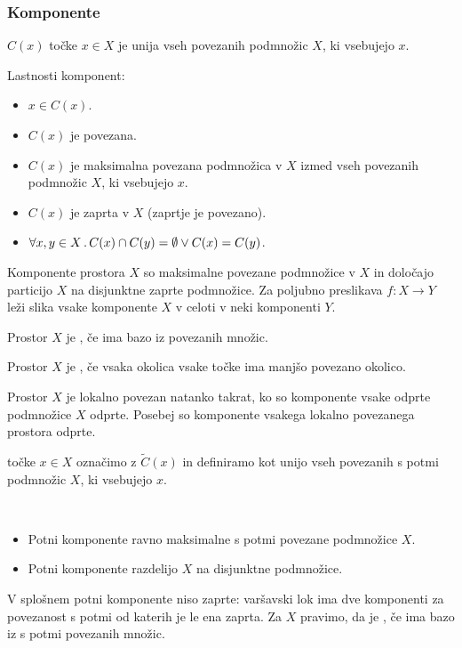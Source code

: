 \subsubsection{Komponente}
\begin{definicija}
     $C(x)$ točke $x \in X$ je unija vseh povezanih podmnožic $X$, ki vsebujejo $x$.
\end{definicija}
\begin{trditev}
    Lastnosti komponent:
    \begin{itemize}
        \item $x \in C(x)$.
        \item $C(x)$ je povezana.
        \item $C(x)$ je maksimalna povezana podmnožica v $X$ izmed vseh povezanih podmnožic $X$, ki vsebujejo $x$.
        \item $C(x)$ je zaprta v $X$ (zaprtje je povezano).
        \item $\forall x, y \in X \,.\, C(x) \cap C(y) = \emptyset \lor C(x) = C(y)$.
    \end{itemize}
\end{trditev}

\newpage
\begin{izrek}
    Komponente prostora $X$ so maksimalne povezane podmnožice v $X$ in določajo particijo $X$ na disjunktne zaprte podmnožice. Za poljubno preslikava $f: X \to Y$ leži slika vsake komponente $X$ v celoti v neki komponenti $Y$.
\end{izrek}

\begin{definicija}
    Prostor $X$ je , če ima bazo iz povezanih množic.
\end{definicija}

\begin{opomba}
    Prostor $X$ je , če vsaka okolica vsake točke ima manjšo povezano okolico.
\end{opomba}

\begin{trditev}
    Prostor $X$ je lokalno povezan natanko takrat, ko so komponente vsake odprte podmnožice $X$ odprte. Posebej so komponente vsakega lokalno povezanega prostora odprte.
\end{trditev}

 točke $x \in X$ označimo z $\widetilde{C}(x)$ in definiramo kot unijo vseh povezanih s potmi podmnožic $X$, ki vsebujejo $x$.

\begin{opomba}
    \ 
    \begin{itemize}
        \item Potni komponente ravno maksimalne s potmi povezane podmnožice $X$.
        \item Potni komponente razdelijo $X$ na disjunktne podmnožice.
    \end{itemize}

    V splošnem potni komponente niso zaprte: varšavski lok ima dve komponenti za povezanost s potmi od katerih je le ena zaprta. Za $X$ pravimo, da je , če ima bazo iz s potmi povezanih množic.
\end{opomba}

